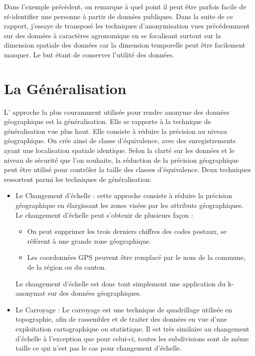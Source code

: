 Dans l'exemple précèdent, on remarque à quel point il peut être parfois facile de ré-identifier une personne à partir de données publiques. Dans la suite de ce rapport, j'essaye de transposé  les techniques d'anonymisation vues précédemment sur des données à caractères agronomique en se focalisant surtout sur la dimension spatiale des données car la dimension temporelle peut être facilement masquer. Le but étant de conserver l'utilité des données.

\section{La Généralisation}
L' approche la plus couramment utilisée pour rendre anonyme des données géographique est la généralisation. Elle se rapporte à la technique de généralisation vue plus haut. Elle consiste à réduire la précision au niveau géographique. On crée ainsi de classe d’équivalence, avec des enregistrements ayant une localisation spatiale identique. Selon la clarté sur les données et le niveau de sécurité que l’on souhaite, la réduction de la précision géographique peut être utilisé pour contrôler la taille des classes d’équivalence. Deux techniques ressortent parmi les techniques de généralisation:  
\begin{itemize}
    \item Le Changement d’échelle : cette approche consiste à réduire la précision géographique en élargissant les zones visées par les attributs géographiques. Le changement d'échelle peut s'obtenir de plusieurs façon : \begin{itemize}
        \item  On peut supprimer les trois derniers chiffres des codes postaux, se référent à une grande zone géographique.
        \item   Les coordonnées GPS peuvent être remplacé par le nom de la commune, de la région ou du canton.
    \end{itemize} 
    Le changement d’échelle est donc tout simplement une application du k-anonymat sur des données géographiques. 
    \item   Le Carroyage : Le carroyage est une technique de quadrillage utilisée en topographie, afin de rassembler et de traiter des données en vue d’une exploitation cartographique ou statistique. Il est très similaire au changement d’échelle à l’exception que pour celui-ci, toutes les subdivisions sont de même taille ce qui n’est pas le cas pour changement d’échelle. 
\end{itemize}

